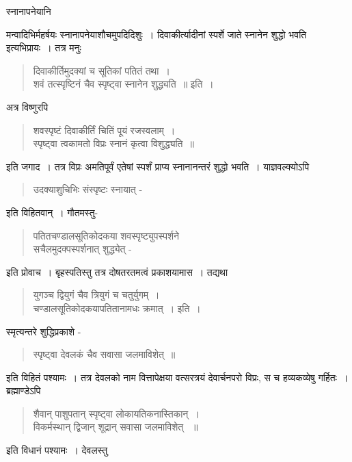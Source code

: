 {स्नानापनेयानि \

मन्वादिभिर्महर्षयः स्नानापनेयाशौचमुपदिदिशुः~। दिवाकीर्त्यादीनां स्पर्शे जाते स्नानेन शुद्धो भवति इत्यभिप्रायः~। तत्र मनुः 
\begin{verse}
दिवाकीर्तिमुदक्यां च सूतिकां पतितं तथा~। \\
शवं तत्स्पृष्टिनं चैव स्पृष्ट्वा स्नानेन शुद्ध्यति~॥ इति~। 
\end{verse}
अत्र विष्णुरपि 
\begin{verse}
शवस्पृष्टं दिवाकीर्तिं चितिं पूयं रजस्वलाम्~। \\
स्पृष्ट्वा त्वकामतो विप्रः स्नानं कृत्वा विशुद्ध्यति~॥ 
\end{verse}
इति जगाद~। तत्र विप्रः अमतिपूर्वं एतेषां स्पर्शं प्राप्य स्नानानन्तरं शुद्धो भवति~। याज्ञवल्क्योऽपि 
\begin{verse}
उदक्याशुचिभिः संस्पृष्टः स्नायात् -
\end{verse}
इति विहितवान्~। गौतमस्तु- 
\begin{verse}
पतितचण्डालसूतिकोदकया शवस्पृष्ट्युपस्पर्शने \\सचैलमुदक्पस्पर्शनात् शुद्ध्येत् -
\end{verse}
इति प्रोवाच~। बृहस्पतिस्तु तत्र दोषतरतमत्वं प्रकाशयामास~। तद्यथा 
\begin{verse}
युगञ्च द्वियुगं चैव त्रियुगं च चतुर्युगम्~। \\
चण्डालसूतिकोदकयापतितानामधः क्रमात्~। इति~। 
\end{verse}
स्मृत्यन्तरे शुद्धिप्रकाशे - 
\begin{verse}
स्पृष्ट्वा देवलकं चैव सवासा जलमाविशेत्~॥
\end{verse}
इति विहितं पश्यामः~। तत्र देवलको नाम वित्तापेक्षया वत्सरत्रयं देवार्चनपरो विप्रः, स च हव्यकव्येषु गर्हितः~। ब्रह्माण्डेऽपि 
\begin{verse}
शैवान् पाशुपतान् स्पृष्ट्वा लोकायतिकनास्तिकान्~। \\
विकर्मस्थान् द्विजान् शूद्रान् सवासा जलमाविशेत् ~॥ 
\end{verse}

इति विधानं पश्यामः~।  देवलस्तु 

}
